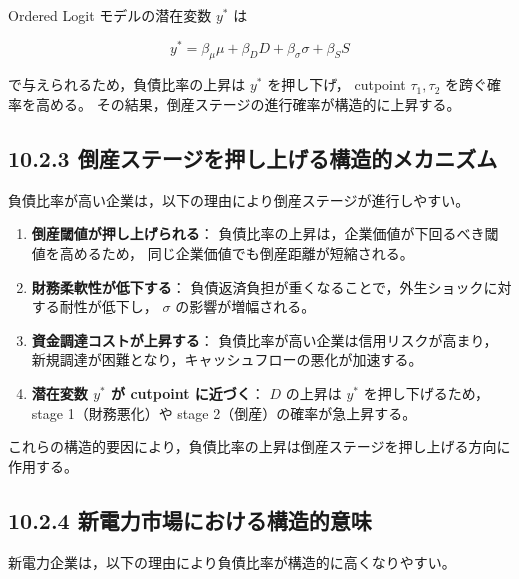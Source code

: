 Ordered Logit モデルの潜在変数 $y^*$ は



\[
y^* = \beta_\mu \mu + \beta_D D + \beta_\sigma \sigma + \beta_S S
\]



で与えられるため，負債比率の上昇は $y^*$ を押し下げ，
cutpoint $\tau_1, \tau_2$ を跨ぐ確率を高める。
その結果，倒産ステージの進行確率が構造的に上昇する。

\subsection*{10.2.3 倒産ステージを押し上げる構造的メカニズム}

負債比率が高い企業は，以下の理由により倒産ステージが進行しやすい。

\begin{enumerate}
    \item \textbf{倒産閾値が押し上げられる}：  
          負債比率の上昇は，企業価値が下回るべき閾値を高めるため，
          同じ企業価値でも倒産距離が短縮される。

    \item \textbf{財務柔軟性が低下する}：  
          負債返済負担が重くなることで，外生ショックに対する耐性が低下し，
          $\sigma$ の影響が増幅される。

    \item \textbf{資金調達コストが上昇する}：  
          負債比率が高い企業は信用リスクが高まり，
          新規調達が困難となり，キャッシュフローの悪化が加速する。

    \item \textbf{潜在変数 $y^*$ が cutpoint に近づく}：  
          $D$ の上昇は $y^*$ を押し下げるため，
          stage 1（財務悪化）や stage 2（倒産）の確率が急上昇する。
\end{enumerate}

これらの構造的要因により，負債比率の上昇は倒産ステージを押し上げる方向に作用する。

\subsection*{10.2.4 新電力市場における構造的意味}

新電力企業は，以下の理由により負債比率が構造的に高くなりやすい。


